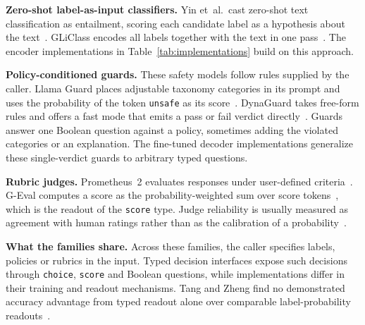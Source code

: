 \noindent\textbf{Zero-shot label-as-input classifiers.} Yin et~al.\ cast zero-shot text classification as entailment, scoring each candidate label as a hypothesis about the text~\cite{yin2019benchmarking}. GLiClass encodes all labels together with the text in one pass~\cite{stepanov2025gliclass}. The encoder implementations in Table~\ref{tab:implementations} build on this approach.

\noindent\textbf{Policy-conditioned guards.} These safety models follow rules supplied by the caller. Llama Guard places adjustable taxonomy categories in its prompt and uses the probability of the token \texttt{unsafe} as its score~\cite{inan2023llama}. DynaGuard takes free-form rules and offers a fast mode that emits a pass or fail verdict directly~\cite{hoover2025dynaguard}. Guards answer one Boolean question against a policy, sometimes adding the violated categories or an explanation. The fine-tuned decoder implementations generalize these single-verdict guards to arbitrary typed questions.

\noindent\textbf{Rubric judges.} Prometheus~2 evaluates responses under user-defined criteria~\cite{kim2024prometheus2}. G-Eval computes a score as the probability-weighted sum over score tokens~\cite{liu2023geval}, which is the readout of the \texttt{score} type. Judge reliability is usually measured as agreement with human ratings rather than as the calibration of a probability~\cite{gu2024survey}.

\noindent\textbf{What the families share.} Across these families, the caller specifies labels, policies or rubrics in the input. Typed decision interfaces expose such decisions through \texttt{choice}, \texttt{score} and Boolean questions, while implementations differ in their training and readout mechanisms. Tang and Zheng find no demonstrated accuracy advantage from typed readout alone over comparable label-probability readouts~\cite{tang2026typed}.
